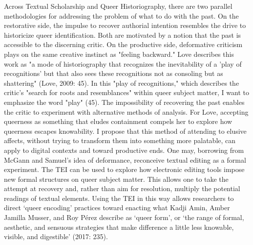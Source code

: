 \documentclass[11pt]{article}
\begin{document}
Across Textual Scholarship and Queer Historiography, there are two
parallel methodologies for addressing the problem of what to do with
the past. On the restorative side, the impulse to recover authorial
intention resembles the drive to historicize queer
identification. Both are motivated by a notion that the past is
accessible to the discerning critic. On the productive side,
deformative criticism plays on the same creative instinct as "feeling
backward." Love describes this work as "a mode of historiography that
recognizes the inevitability of a 'play of recognitions' but that also
sees these recognitions not as consoling but as shattering" (Love,
2009: 45). In this "play of recognitions," which describes the
critic's "search for roots and resemblances" within queer subject
matter, I want to emphasize the word "play" (45). The impossibility of
recovering the past enables the critic to experiment with alternative
methods of analysis. For Love, accepting queerness as something that
eludes containment compels her to explore how queerness escapes
knowability. I propose that this method of attending to elusive
affects, without trying to transform them into something more
palatable, can apply to digital contexts and toward productive
ends. One may, borrowing from McGann and Samuel's idea of deformance,
reconceive textual editing as a formal experiment. The TEI can be used
to explore how electronic editing tools impose new formal structures
on queer subject matter. This allows one to take the attempt at
recovery and, rather than aim for resolution, multiply the potential
readings of textual elements. Using the TEI in this way allows
researchers to direct ‘queer encoding' practices toward enacting what
Kadji Amin, Amber Jamilla Musser, and Roy Pérez describe as ‘queer
form', or ‘the range of formal, aesthetic, and sensuous strategies
that make difference a little less knowable, visible, and digestible'
(2017: 235).
\end{document}

